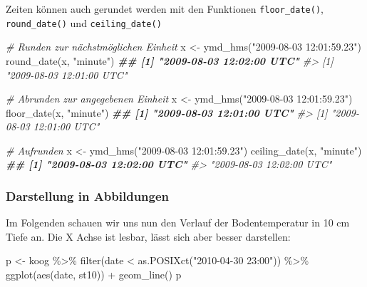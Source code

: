 \documentclass[
]{article}
\newenvironment{Shaded}{\begin{snugshade}}{\end{snugshade}}
\newcommand{\CommentTok}[1]{\textcolor[rgb]{0.56,0.35,0.01}{\textit{#1}}}
\newcommand{\DocumentationTok}[1]{\textcolor[rgb]{0.56,0.35,0.01}{\textbf{\textit{#1}}}}
\newcommand{\FunctionTok}[1]{\textcolor[rgb]{0.00,0.00,0.00}{#1}}
\newcommand{\NormalTok}[1]{#1}
\newcommand{\OtherTok}[1]{\textcolor[rgb]{0.56,0.35,0.01}{#1}}
\newcommand{\SpecialCharTok}[1]{\textcolor[rgb]{0.00,0.00,0.00}{#1}}
\newcommand{\StringTok}[1]{\textcolor[rgb]{0.31,0.60,0.02}{#1}}
\begin{document}
Zeiten können auch gerundet werden mit den Funktionen \texttt{floor\_date()}, \texttt{round\_date()} und \texttt{ceiling\_date()}

\begin{Shaded}
\begin{Highlighting}[]
\CommentTok{\# Runden zur nächstmöglichen Einheit}
\NormalTok{x }\OtherTok{\textless{}{-}} \FunctionTok{ymd\_hms}\NormalTok{(}\StringTok{"2009{-}08{-}03 12:01:59.23"}\NormalTok{)}
\FunctionTok{round\_date}\NormalTok{(x, }\StringTok{"minute"}\NormalTok{)}
\DocumentationTok{\#\# [1] "2009{-}08{-}03 12:02:00 UTC"}
\CommentTok{\#\textgreater{} [1] "2009{-}08{-}03 12:01:00 UTC"}

\CommentTok{\# Abrunden zur angegebenen Einheit}
\NormalTok{x }\OtherTok{\textless{}{-}} \FunctionTok{ymd\_hms}\NormalTok{(}\StringTok{"2009{-}08{-}03 12:01:59.23"}\NormalTok{)}
\FunctionTok{floor\_date}\NormalTok{(x, }\StringTok{"minute"}\NormalTok{)}
\DocumentationTok{\#\# [1] "2009{-}08{-}03 12:01:00 UTC"}
\CommentTok{\#\textgreater{} [1] "2009{-}08{-}03 12:01:00 UTC"}

\CommentTok{\# Aufrunden }
\NormalTok{x }\OtherTok{\textless{}{-}} \FunctionTok{ymd\_hms}\NormalTok{(}\StringTok{"2009{-}08{-}03 12:01:59.23"}\NormalTok{)}
\FunctionTok{ceiling\_date}\NormalTok{(x, }\StringTok{"minute"}\NormalTok{)}
\DocumentationTok{\#\# [1] "2009{-}08{-}03 12:02:00 UTC"}
\CommentTok{\#\textgreater{} "2009{-}08{-}03 12:02:00 UTC"}
\end{Highlighting}
\end{Shaded}

\hypertarget{darstellung-in-abbildungen}{%
\subsubsection{Darstellung in Abbildungen}\label{darstellung-in-abbildungen}}

Im Folgenden schauen wir uns nun den Verlauf der Bodentemperatur in 10 cm Tiefe an. Die X Achse ist lesbar, lässt sich aber besser darstellen:

\begin{Shaded}
\begin{Highlighting}[]
\NormalTok{p }\OtherTok{\textless{}{-}}\NormalTok{ koog }\SpecialCharTok{\%\textgreater{}\%}
  \FunctionTok{filter}\NormalTok{(date }\SpecialCharTok{\textless{}} \FunctionTok{as.POSIXct}\NormalTok{(}\StringTok{"2010{-}04{-}30 23:00"}\NormalTok{)) }\SpecialCharTok{\%\textgreater{}\%}
  \FunctionTok{ggplot}\NormalTok{(}\FunctionTok{aes}\NormalTok{(date, st10)) }\SpecialCharTok{+}
  \FunctionTok{geom\_line}\NormalTok{()}
\NormalTok{p}
\end{Highlighting}
\end{Shaded}
\end{document}
